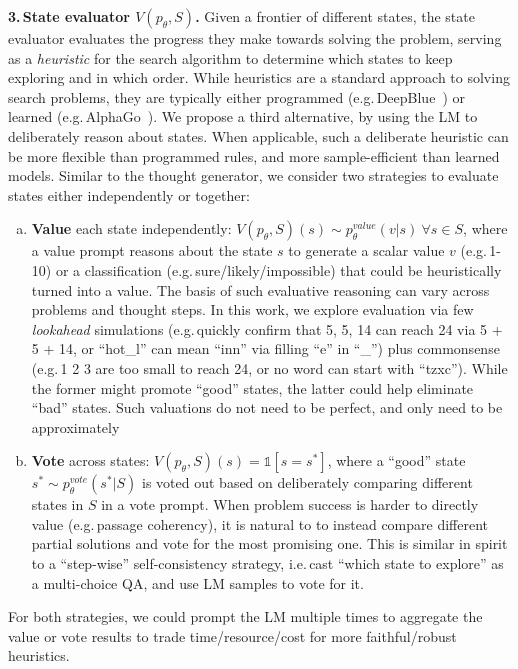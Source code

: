 \documentclass{article}
\begin{document}
\textbf{3.\,State evaluator $V(p_\theta, S)$.} 
Given a frontier of different states, the state evaluator evaluates the progress they make towards  solving the problem, serving as a {\em heuristic} for the search algorithm to determine which states to keep exploring and in which order. While heuristics are a standard approach to solving search problems, they are typically either programmed (e.g.\,DeepBlue~\citep{campbell2002deep}) or learned (e.g.\,AlphaGo~\cite{silver2017mastering}). %
We propose a third alternative, by using the LM to deliberately reason about states. When applicable, such a deliberate heuristic can be more flexible than programmed rules, and more sample-efficient than learned models. 
Similar to the thought generator, we consider two strategies to evaluate states either independently or together: 
\vspace{-5pt}
\begin{enumerate}[(a)]
    \item 
    \textbf{Value} each state independently: $V(p_\theta, S)(s) \sim p_\theta^{value}(v|s) \ \forall s \in S$, where a value prompt reasons about the state $s$ to generate a scalar value $v$ (e.g.\,1-10) or a classification (e.g.\,sure/likely/impossible) that could be heuristically turned into a value. The basis of such evaluative reasoning can vary across problems and thought steps. In this work, we explore evaluation via few \textit{lookahead} simulations (e.g.\,quickly confirm that 5, 5, 14 can reach 24 via 5 + 5  + 14, or  ``hot\_l'' can mean ``inn'' via filling ``e'' in ``\_'') plus commonsense (e.g.\,1 2 3 are too small to reach 24, or no word can start with ``tzxc''). While the former might promote ``good'' states, the latter could help eliminate ``bad'' states. Such valuations do not need to be perfect, and only need to be approximately 
    \item
    \textbf{Vote} across states:  $V(p_\theta, S)(s) = \mathds{1}[s=s^*]$, where a ``good'' state $s^* \sim p_\theta^{vote}(s^*|S)$ is voted out based on deliberately comparing different states in $S$ in a vote prompt. 
    When problem success is harder to directly value (e.g.\,passage coherency), it is natural to to instead compare different partial solutions and vote for the most promising one. This is similar in spirit to a ``step-wise'' self-consistency strategy, i.e.\,cast ``which state to explore'' as a multi-choice QA, and use LM samples to vote for it.
    \vspace{-6pt}
\end{enumerate}
For both strategies, we could prompt the LM multiple times to aggregate the value or vote results to trade time/resource/cost for more faithful/robust heuristics.
\end{document}
